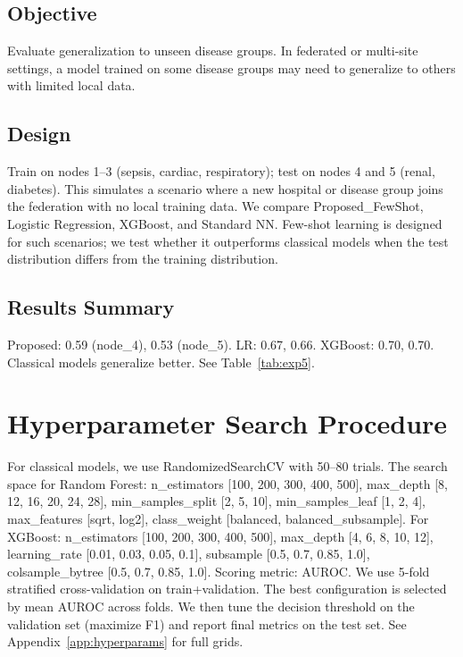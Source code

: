 \subsection{Objective}

Evaluate generalization to unseen disease groups. In federated or multi-site settings, a model trained on some disease groups may need to generalize to others with limited local data.

\subsection{Design}

Train on nodes 1--3 (sepsis, cardiac, respiratory); test on nodes 4 and 5 (renal, diabetes). This simulates a scenario where a new hospital or disease group joins the federation with no local training data. We compare Proposed\_FewShot, Logistic Regression, XGBoost, and Standard NN. Few-shot learning is designed for such scenarios; we test whether it outperforms classical models when the test distribution differs from the training distribution.

\subsection{Results Summary}

Proposed: 0.59 (node\_4), 0.53 (node\_5). LR: 0.67, 0.66. XGBoost: 0.70, 0.70. Classical models generalize better. See Table~\ref{tab:exp5}.

\section{Hyperparameter Search Procedure}

For classical models, we use RandomizedSearchCV with 50--80 trials. The search space for Random Forest: n\_estimators [100, 200, 300, 400, 500], max\_depth [8, 12, 16, 20, 24, 28], min\_samples\_split [2, 5, 10], min\_samples\_leaf [1, 2, 4], max\_features [sqrt, log2], class\_weight [balanced, balanced\_subsample]. For XGBoost: n\_estimators [100, 200, 300, 400, 500], max\_depth [4, 6, 8, 10, 12], learning\_rate [0.01, 0.03, 0.05, 0.1], subsample [0.5, 0.7, 0.85, 1.0], colsample\_bytree [0.5, 0.7, 0.85, 1.0]. Scoring metric: AUROC. We use 5-fold stratified cross-validation on train+validation. The best configuration is selected by mean AUROC across folds. We then tune the decision threshold on the validation set (maximize F1) and report final metrics on the test set. See Appendix~\ref{app:hyperparams} for full grids.

